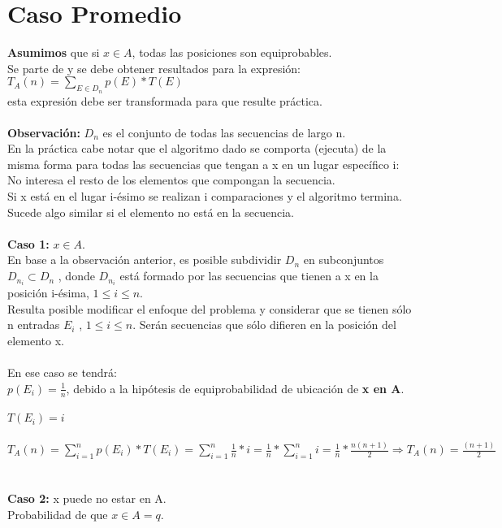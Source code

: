 \documentclass[a4paper,10pt]{article}
\begin{document}
\section{Caso Promedio}
\textbf{Asumimos} que si $x \in A$, todas las posiciones son equiprobables.\\
Se parte de y se debe obtener resultados para la expresión: $T_A(n) = \displaystyle\sum_{{E \in D_n}} p(E) * T(E)$\\
esta expresión debe ser transformada para que resulte práctica.\\\\
\textbf{Observación:}
$D_n$ es el conjunto de todas las secuencias de largo n.\\
En la práctica cabe notar que el algoritmo dado se comporta (ejecuta) de la misma forma para todas las secuencias que tengan a x en un lugar específico i: No interesa el resto de los elementos que compongan la secuencia.\\Si x está en el lugar i-ésimo se realizan i comparaciones y el algoritmo termina. Sucede algo similar si el elemento no está en la secuencia.\\\\
\textbf{Caso 1:} $x \in A$.\\
En base a la observación anterior, es posible subdividir $D_n$ en subconjuntos $D_{n_i} \subset D_n$ , donde $D_{n_i}$ está formado por las secuencias que tienen a x en la posición i-ésima, $1 \leq i \leq n$. \\
Resulta posible modificar el enfoque del problema y considerar que se tienen sólo n entradas $E_i$ , $1 \leq i \leq n$. Serán secuencias que sólo difieren en la posición del elemento x.\\\\
En ese caso se tendrá:\\
$p(E_i) = \frac{1}{n}$, debido a la hipótesis de equiprobabilidad de ubicación de \textbf{x en A}.\\\\
$T(E_i) = i$\\\\
$T_A(n) = \displaystyle\sum_{i=1}^{n} p(E_i) * T(E_i) = \sum_{i=1}^n \frac{1}{n} * i = \frac{1}{n} * \sum_{i=1}^n i = \frac{1}{n} * \frac{n(n+1)}{2} \Rightarrow T_A(n) = \frac{(n+1)}{2}$\\\\\\
\textbf{Caso 2:} x puede no estar en A.\\
Probabilidad de que $x \in A = q$.\\
\end{document}
